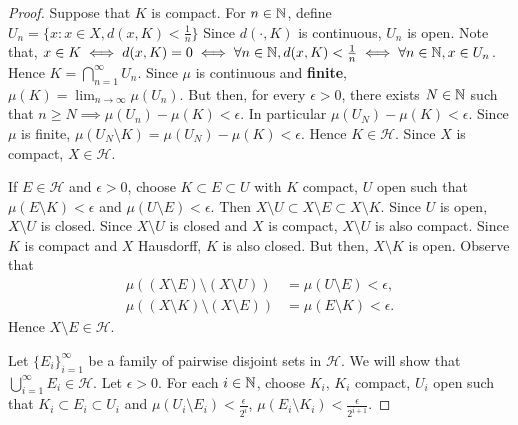 \begin{definition}
\begin{proof}
    Suppose that $K$ is compact. For $n \in {\mathbb N}$, define $U_n = \{ x : x \in X, d(x, K) < \frac{1}{n} \}$
    Since $d(\cdot, K)$ is continuous, $U_n$ is open. Note that, $x \in K \iff d(x, K) = 0 \iff \forall n \in {\mathbb N},  d(x, K) < \frac{1}{n} \iff \forall n \in {\mathbb N}, x \in U_n$. Hence $K = \bigcap_{n = 1}^{\infty} U_n$. Since $\mu$ is continuous and \textbf{finite}, $\mu(K) = \lim_{n \to \infty} \mu(U_n)$. But then, for every $\epsilon > 0$, there exists $N \in {\mathbb N}$ such that $n \geq N \implies \mu(U_n) - \mu(K) < \epsilon$. In particular $\mu(U_N) - \mu(K) < \epsilon$. Since $\mu$ is finite, $\mu(U_N \setminus K) = \mu(U_N) - \mu(K) < \epsilon$. Hence $K \in \mathcal{H}$. Since $X$ is compact, $X \in \mathcal{H}$.
    
    If $E \in \mathcal{H}$ and $\epsilon > 0$, choose $K \subset E \subset U$ with $K$ compact, $U$ open such that $\mu(E \setminus K)< \epsilon$ and $\mu(U \setminus E) < \epsilon$. Then $X \setminus U \subset X \setminus E \subset X \setminus K$. Since $U$ is open, $X \setminus U$ is closed. Since $X \setminus U$ is closed and $X$ is compact, $X \setminus U$ is also compact. Since $K$ is compact and $X$ Hausdorff, $K$ is also closed. But then, $X \setminus K$ is open. Observe that \begin{align*}
          \mu ((X \setminus E) \setminus (X \setminus U)) &= \mu(U \setminus E) < \epsilon, \\
          \mu ((X \setminus K) \setminus (X \setminus E)) &= \mu(E \setminus K) < \epsilon.
    \end{align*}
    Hence $X \setminus E \in \mathcal{H}$.
    
    Let $\{ E_i \}_{i=1}^\infty$ be a family of pairwise disjoint sets in $\mathcal{H}$. We will show that $\bigcup_{i=1}^\infty E_i \in \mathcal{H}$. Let $\epsilon > 0$. For each $i \in {\mathbb N}$, choose $K_i$, $K_i$ compact, $U_i$ open such that $K_i \subset E_i \subset U_i$ and $\mu(U_i \setminus E_i) < \frac{\epsilon}{2^i}$, $\mu(E_i \setminus K_i) < \frac{\epsilon}{2^{i+1}}$. 
    

\end{proof}
\end{definition}

